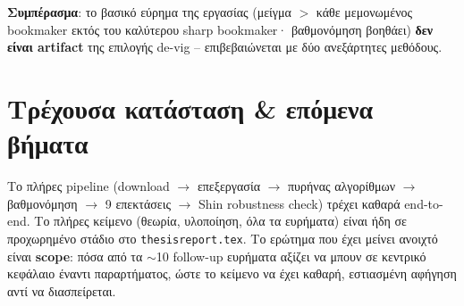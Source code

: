 \documentclass[11pt,a4paper]{article}
\newcommand{\file}[1]{\texttt{#1}}
\renewcommand{\_}{\oldunderscore\allowbreak}
\begin{document}
\textbf{Συμπέρασμα}: το βασικό εύρημα της εργασίας (μείγμα $>$ κάθε μεμονωμένος
bookmaker εκτός του καλύτερου sharp bookmaker· βαθμονόμηση βοηθάει) \textbf{δεν είναι
artifact} της επιλογής de-vig -- επιβεβαιώνεται με δύο ανεξάρτητες μεθόδους.

\section{Τρέχουσα κατάσταση \& επόμενα βήματα}

Το πλήρες pipeline (download $\to$ επεξεργασία $\to$ πυρήνας αλγορίθμων $\to$
βαθμονόμηση $\to$ 9 επεκτάσεις $\to$ Shin robustness check) τρέχει καθαρά end-to-end. Το
πλήρες κείμενο (θεωρία, υλοποίηση, όλα τα ευρήματα) είναι ήδη σε προχωρημένο στάδιο στο
\file{thesis\_report.tex}. Το ερώτημα που έχει μείνει ανοιχτό είναι \textbf{scope}: πόσα
από τα $\sim$10 follow-up ευρήματα αξίζει να μπουν σε κεντρικό κεφάλαιο έναντι
παραρτήματος, ώστε το κείμενο να έχει καθαρή, εστιασμένη αφήγηση αντί να διασπείρεται.
\end{document}
